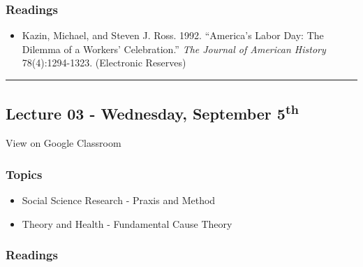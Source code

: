 \documentclass[]{book}
\providecommand{\tightlist}{%
  \setlength{\itemsep}{0pt}\setlength{\parskip}{0pt}}
\theoremstyle{definition}
\theoremstyle{definition}
\theoremstyle{definition}
\theoremstyle{remark}
\begin{document}
\hypertarget{readings-2}{%
\subsubsection*{Readings}\label{readings-2}}

\begin{itemize}
\tightlist
\item
  Kazin, Michael, and Steven J. Ross. 1992. ``America's Labor Day: The
  Dilemma of a Workers' Celebration.'' \emph{The Journal of American
  History} 78(4):1294-1323. (Electronic Reserves)
\end{itemize}

\begin{center}\rule{0.5\linewidth}{\linethickness}\end{center}

\hypertarget{lecture-03---wednesday-september-5th}{%
\subsection*{\texorpdfstring{Lecture 03 - Wednesday, September
5\textsuperscript{th}}{Lecture 03 - Wednesday, September 5th}}\label{lecture-03---wednesday-september-5th}}

View on Google Classroom

\hypertarget{topics-3}{%
\subsubsection*{Topics}\label{topics-3}}

\begin{itemize}
\tightlist
\item
  Social Science Research - Praxis and Method
\item
  Theory and Health - Fundamental Cause Theory
\end{itemize}

\hypertarget{readings-3}{%
\subsubsection*{Readings}\label{readings-3}}
\end{document}
